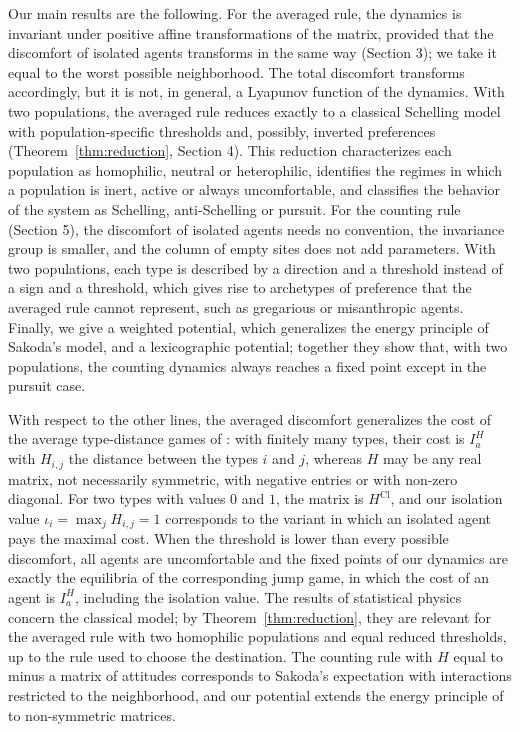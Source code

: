 \documentclass{article}
\theoremstyle{remark}
\begin{document}
Our main results are the following. For the averaged rule, the dynamics is invariant under positive affine transformations of the matrix, provided that the discomfort of isolated agents transforms in the same way (Section 3); we take it equal to the worst possible neighborhood. The total discomfort transforms accordingly, but it is not, in general, a Lyapunov function of the dynamics. With two populations, the averaged rule reduces exactly to a classical Schelling model with population-specific thresholds and, possibly, inverted preferences (Theorem~\ref{thm:reduction}, Section 4). This reduction characterizes each population as homophilic, neutral or heterophilic, identifies the regimes in which a population is inert, active or always uncomfortable, and classifies the behavior of the system as Schelling, anti-Schelling or pursuit. For the counting rule (Section 5), the discomfort of isolated agents needs no convention, the invariance group is smaller, and the column of empty sites does not add parameters. With two populations, each type is described by a direction and a threshold instead of a sign and a threshold, which gives rise to archetypes of preference that the averaged rule cannot represent, such as gregarious or misanthropic agents. Finally, we give a weighted potential, which generalizes the energy principle of Sakoda's model, and a lexicographic potential; together they show that, with two populations, the counting dynamics always reaches a fixed point except in the pursuit case.

With respect to the other lines, the averaged discomfort generalizes the cost of the average type-distance games of \cite{bilo2023schelling}: with finitely many types, their cost is $I^H_a$ with $H_{i,j}$ the distance between the types $i$ and $j$, whereas $H$ may be any real matrix, not necessarily symmetric, with negative entries or with non-zero diagonal. For two types with values $0$ and $1$, the matrix is $H^{\mathrm{Cl}}$, and our isolation value $\iota_i=\max_j H_{i,j}=1$ corresponds to the variant in which an isolated agent pays the maximal cost. When the threshold is lower than every possible discomfort, all agents are uncomfortable and the fixed points of our dynamics are exactly the equilibria of the corresponding jump game, in which the cost of an agent is $I^H_a$, including the isolation value. The results of statistical physics \cite{dallasta2008statistical} concern the classical model; by Theorem~\ref{thm:reduction}, they are relevant for the averaged rule with two homophilic populations and equal reduced thresholds, up to the rule used to choose the destination. The counting rule with $H$ equal to minus a matrix of attitudes corresponds to Sakoda's expectation with interactions restricted to the neighborhood, and our potential extends the energy principle of \cite{medina2017self} to non-symmetric matrices.
\end{document}
